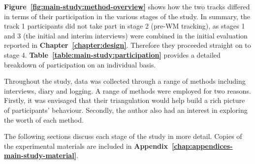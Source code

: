 \textbf{Figure~\ref{fig:main-study:method-overview}} shows how the two tracks differed in terms of their participation in the various stages of the study.  In summary, the track 1 participants did not take part in stage 2 (pre-WM tracking), as stages 1 and 3 (the initial and interim interviews) were combined in the initial evaluation reported in \textbf{Chapter~\ref{chapter:design}}.  Therefore they proceeded straight on to stage 4.  \textbf{Table~\ref{table:main-study:participation}} provides a detailed breakdown of participation on an individual basis.

Throughout the study, data was collected through a range of methods including interviews, diary and logging.  A range of methods were employed for two reasons.  Firstly, it was envisaged that their triangulation would help build a rich picture of participants' behaviour. 
Secondly, the author also had an interest in exploring the worth of each method.

The following sections discuss each stage of the study in more detail.
Copies of the experimental materials are included in \textbf{Appendix~\ref{chap:appendices-main-study-material}}. %




